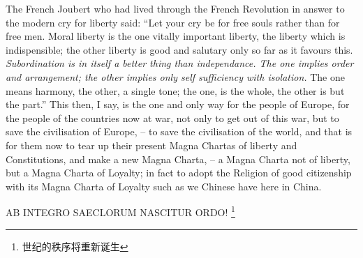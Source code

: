 The French Joubert who had lived through the French Revolution in answer to the modern cry for liberty said:
``Let your cry be for free souls rather than for free men. Moral liberty is the one vitally important liberty,
the liberty which is indispensible; the other liberty is good and salutary only so far as it favours this.
\emph{Subordination is in itself a better thing than independance.
The one implies order and arrangement;
the other implies only self sufficiency with isolation.}
The one means harmony, the other, a single tone;
the one, is the whole, the other is but the part.''
This then, I say, is the one and only way for the people of Europe,
for the people of the countries now at war, not only to get out of this war,
but to save the civilisation of Europe,  -- to save the civilisation of the world,
and that is for them now to tear up their present Magna Chartas of liberty and Constitutions, and make a new Magna Charta,
-- a Magna Charta not of liberty, but a Magna Charta of Loyalty;
in fact to adopt the Religion of good citizenship with its Magna Charta of Loyalty such as we Chinese have here in China.

AB INTEGRO SAECLORUM NASCITUR ORDO!
\footnote{世纪的秩序将重新诞生}
